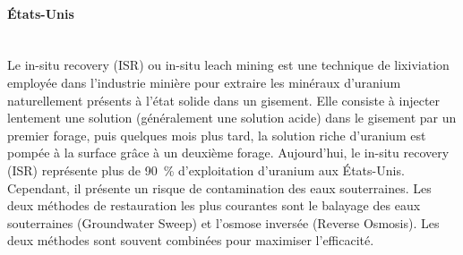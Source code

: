 \documentclass{article}
\begin{document}
\paragraph{États-Unis \\ \\}
Le in-situ recovery (ISR) ou in-situ leach mining est une technique de lixiviation employée dans l’industrie minière pour extraire les minéraux d’uranium naturellement présents à l'état solide dans un gisement. Elle consiste à injecter lentement une solution (généralement une solution acide) dans le gisement par un premier forage, puis quelques mois plus tard, la solution riche d’uranium est pompée à la surface grâce à un deuxième forage. 
Aujourd’hui, le in-situ recovery (ISR) représente plus de 90~\% d’exploitation d’uranium aux États-Unis. Cependant, il présente un risque de contamination des eaux souterraines.
Les deux méthodes de restauration les plus courantes sont le balayage des eaux souterraines (Groundwater Sweep) et l'osmose inversée (Reverse Osmosis).
Les deux méthodes sont souvent combinées pour maximiser l’efficacité.%
\end{document}
